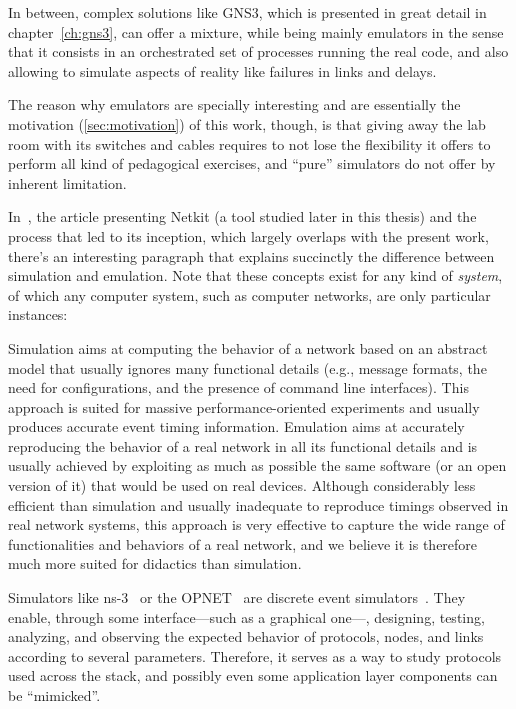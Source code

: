 In between, complex solutions like GNS3, which is presented in great detail in chapter~\ref{ch:gns3}, can offer a mixture, while being mainly emulators in the sense that it consists in an orchestrated set of processes running the real code, and also allowing to simulate aspects of reality like failures in links and delays.

The reason why emulators are specially interesting and are essentially the motivation (\ref{sec:motivation}) of this work, though, is that giving away the lab room with its switches and cables requires to not lose the flexibility it offers to perform all kind of pedagogical exercises, and ``pure'' simulators do not offer by inherent limitation.

In~\cite{netkit-full}, the article presenting Netkit (a tool studied later in this thesis) and the process that led to its inception, which largely overlaps with the present work, there's an interesting paragraph that explains succinctly the difference between simulation and emulation.
Note that these concepts exist for any kind of \emph{system}, of which any computer system, such as computer networks, are only particular instances:
\begin{displayquote}
Simulation aims at computing the behavior of a network based on an abstract model that usually ignores many functional details (e.g., message formats, the need for configurations, and the presence of command line interfaces).
This approach is suited for massive performance-oriented experiments and usually produces accurate event timing information.
Emulation aims at accurately reproducing the behavior of a real network in all its functional details and is usually achieved by exploiting as much as possible the same software (or an open version of it) that would be used on real devices.
Although considerably less efficient than simulation and usually inadequate to reproduce timings observed in real network systems, this approach is very effective to capture the wide range of functionalities and behaviors of a real network, and we believe it is therefore much more suited for didactics than simulation.
\end{displayquote}
Simulators like ns-3~\cite{ns3} or the OPNET~\cite{introtoopnet} are discrete event simulators~\cite{netsimoremu}.
They enable, through some interface---such as a graphical one---, designing, testing, analyzing, and observing the expected behavior of protocols, nodes, and links according to several parameters. Therefore, it serves as a way to study protocols used across the stack, and possibly even some application layer components can be ``mimicked''.

